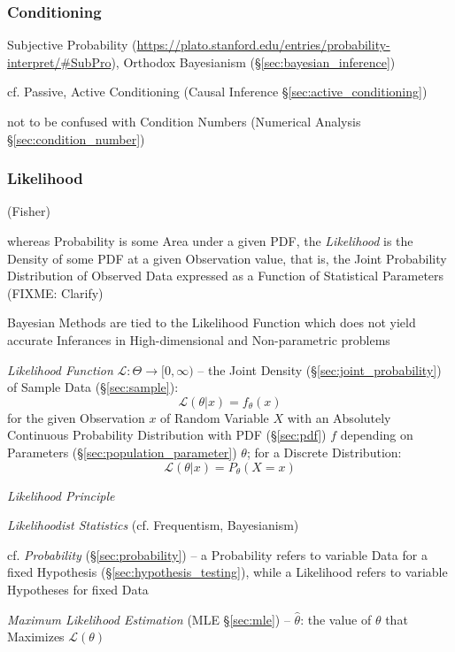 \subsubsection{Conditioning}\label{sec:conditioning}

Subjective Probability
(\url{https://plato.stanford.edu/entries/probability-interpret/#SubPro}),
Orthodox Bayesianism (\S\ref{sec:bayesian_inference})

\fist cf. Passive, Active Conditioning (Causal Inference
\S\ref{sec:active_conditioning})

\fist not to be confused with Condition Numbers (Numerical Analysis
\S\ref{sec:condition_number})



\subsubsection{Likelihood}\label{sec:likelihood}

(Fisher)

whereas Probability is some Area under a given PDF, the \emph{Likelihood} is the
Density of some PDF at a given Observation value, that is, the Joint Probability
Distribution of Observed Data expressed as a Function of Statistical Parameters
(FIXME: Clarify)

\fist Bayesian Methods are tied to the Likelihood Function which does not yield
accurate Inferances in High-dimensional and Non-parametric problems

\emph{Likelihood Function} $\mathcal{L} : \Theta \to [0, \infty)$ -- the
  Joint Density (\S\ref{sec:joint_probability}) of Sample Data
  (\S\ref{sec:sample}):
\[
  \mathcal{L}(\theta | x) = f_\theta(x)
\]
for the given Observation $x$ of Random Variable $X$ with an Absolutely
Continuous Probability Distribution with PDF (\S\ref{sec:pdf}) $f$ depending on
Parameters (\S\ref{sec:population_parameter}) $\theta$; for a Discrete
Distribution:
\[
  \mathcal{L}(\theta | x) = P_\theta(X = x)
\]

\emph{Likelihood Principle}

\emph{Likelihoodist Statistics} (cf. Frequentism, Bayesianism)

cf. \emph{Probability} (\S\ref{sec:probability}) -- a Probability refers to
variable Data for a fixed Hypothesis (\S\ref{sec:hypothesis_testing}), while a
Likelihood refers to variable Hypotheses for fixed Data

\emph{Maximum Likelihood Estimation} (MLE \S\ref{sec:mle}) -- $\hat{\theta}$:
the value of $\theta$ that Maximizes $\mathcal{L}(\theta)$

